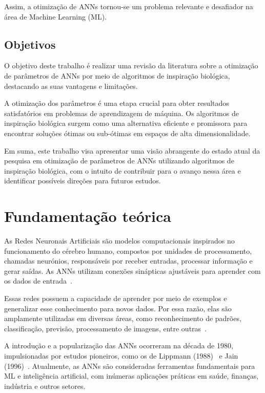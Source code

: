 \documentclass[conference]{IEEEtran}
\begin{document}
    Assim, a otimização de ANNs tornou-se um problema relevante e desafiador na área de Machine Learning (ML).

    \subsection{Objetivos}\label{subsec:objetivos}

    O objetivo deste trabalho é realizar uma revisão da literatura sobre a otimização de parâmetros de ANNs por meio de algoritmos de inspiração biológica, destacando as suas vantagens e limitações.

    A otimização dos parâmetros é uma etapa crucial para obter resultados satisfatórios em problemas de aprendizagem de máquina.
    Os algoritmos de inspiração biológica surgem como uma alternativa eficiente e promissora para encontrar soluções ótimas ou sub-ótimas em espaços de alta dimensionalidade.

    Em suma, este trabalho visa apresentar uma visão abrangente do estado atual da pesquisa em otimização de parâmetros de ANNs utilizando algoritmos de inspiração biológica, com o intuito de contribuir para o avanço nessa área e identificar possíveis direções para futuros estudos.


    \section{Fundamentação teórica}\label{sec:fundamentacao}

    As Redes Neuronais Artificiais são modelos computacionais inspirados no funcionamento do cérebro humano, compostos por unidades de processamento, chamadas neurónios, responsáveis por receber entradas, processar informação e gerar saídas.
    As ANNs utilizam conexões sinápticas ajustáveis para aprender com os dados de entrada~\cite{Lippmann1988AnNets}.

    Essas redes possuem a capacidade de aprender por meio de exemplos e generalizar esse conhecimento para novos dados.
    Por essa razão, elas são amplamente utilizadas em diversas áreas, como reconhecimento de padrões, classificação, previsão, processamento de imagens, entre outras~\cite{Jain1996ArtificialTutorial}.

    A introdução e a popularização das ANNs ocorreram na década de 1980, impulsionadas por estudos pioneiros, como os de Lippmann (1988)~\cite{Lippmann1988AnNets} e Jain (1996)~\cite{Jain1996ArtificialTutorial}.
    Atualmente, as ANNs são consideradas ferramentas fundamentais para ML e inteligência artificial, com inúmeras aplicações práticas em saúde, finanças, indústria e outros setores.
\end{document}
